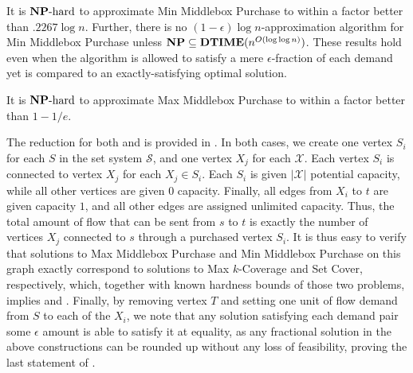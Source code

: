 \begin{thm}
\label{thm:allocminloghard}
It is $\mbox{{\bf NP}{\rm -hard}}$ to approximate {\sc Min Middlebox Purchase} to within a factor better than $.2267 \log n$. Further, there is no $(1-\epsilon)\log n$-approximation algorithm for {\sc Min Middlebox Purchase} unless $\mbox{\bf NP} \subseteq \mbox{\bf DTIME}(n^{O(\log \log n)})$. These results hold even when the algorithm is allowed to satisfy a mere $\epsilon$-fraction of each demand yet is compared to an exactly-satisfying optimal solution.
\end{thm}

\begin{thm}
\label{thm:allocmaxapxhard}
It is $\mbox{{\bf NP}{\rm -hard}}$ to approximate {\sc Max Middlebox Purchase} to within a factor better than $1 - 1/e$. 
\end{thm}

The reduction for both  and  is provided in . In both cases, we create one vertex $S_i$ for each $S$ in the set system $\mathcal{S}$, and one vertex $X_j$ for each $\mathcal{X}$. Each vertex $S_i$ is connected to vertex $X_j$ for each $X_j \in S_i$. Each $S_i$ is given $\mathcal{|X|}$ potential capacity, while all other vertices are given $0$ capacity. Finally, all edges from $X_i$ to $t$ are given capacity $1$, and all other edges are assigned unlimited capacity. Thus, the total amount of flow that can be sent from $s$ to $t$ is exactly the number of vertices $X_j$ connected to $s$ through a purchased vertex $S_i$. It is thus easy to verify that solutions to {\sc Max Middlebox Purchase} and {\sc Min Middlebox Purchase} on this graph exactly correspond to solutions to {\sc Max $k$-Coverage} and {\sc Set Cover}, respectively, which, together with known hardness bounds of those two problems\cite{AMS06}\cite{Feige98}, implies  and . Finally, by removing vertex $T$ and setting one unit of flow demand from $S$ to each of the $X_i$, we note that any solution satisfying each demand pair some $\epsilon$ amount is able to satisfy it at equality, as any fractional solution in the above constructions can be rounded up without any loss of feasibility, proving the last statement of .

